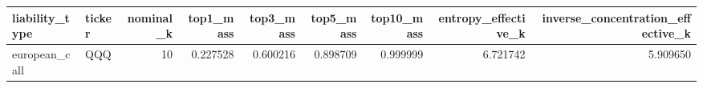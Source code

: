 \begin{tabular}{llrrrrrrr}
\toprule
liability\_type & ticker & nominal\_k & top1\_mass & top3\_mass & top5\_mass & top10\_mass & entropy\_effective\_k & inverse\_concentration\_effective\_k \\
\midrule
european\_call & QQQ & 10 & 0.227528 & 0.600216 & 0.898709 & 0.999999 & 6.721742 & 5.909650 \\
\bottomrule
\end{tabular}
